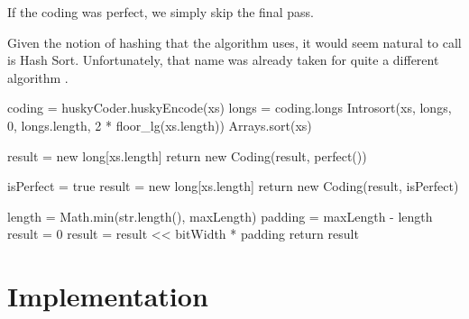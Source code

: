 \documentclass[acmtog]{acmart}
\begin{document}
If the coding was perfect, we simply skip the final pass.

Given the notion of hashing that the algorithm uses, it would seem natural to call is Hash Sort.
Unfortunately, that name was already taken for quite a different algorithm \cite{DBLP:journals/corr/cs-DS-0408040}.

\begin{algorithm}
 coding = huskyCoder.huskyEncode(xs)\;
 longs = coding.longs\;
 Introsort(xs, longs, 0, longs.length, 2 * floor\_lg(xs.length))\;
 Arrays.sort(xs)\;
 \caption{Huskysort.sort}
 \label{alg:the_alg}
\end{algorithm}

\begin{algorithm}
 result = new long[xs.length]\;
 return new Coding(result, perfect())\;
 \caption{huskyEncode}
 \label{alg:the_alg2}
\end{algorithm}

\begin{algorithm}
 isPerfect = true\;
 result = new long[xs.length]\;
 return new Coding(result, isPerfect)\;
 \caption{huskyEncode (for character sequence)}
 \label{alg:the_alg3}
\end{algorithm}

\begin{algorithm}
 length = Math.min(str.length(), maxLength)\;
 padding = maxLength - length\;
 result = 0\;
 result = result << bitWidth * padding\;
return result\;
 \caption{stringToLong}
 \label{alg:the_alg4}
\end{algorithm}

\section{Implementation}
\end{document}
